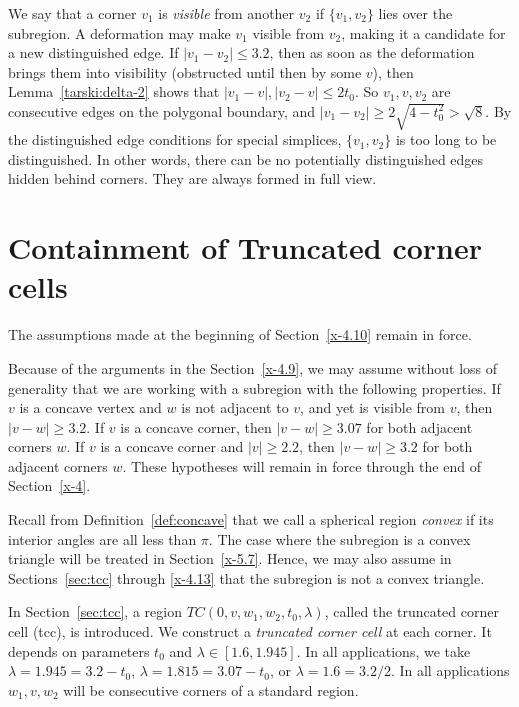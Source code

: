 We say that a corner $v_1$ is {\it visible} from another $v_2$ if
$\{v_1,v_2\}$ lies over the subregion.  A deformation may make $v_1$
visible from $v_2$, making it a candidate for a new distinguished edge.
If $|v_1-v_2|\le 3.2$, then as soon as the deformation brings them into
visibility (obstructed until then by some $v$), then
Lemma~\ref{tarski:delta-2} shows that $|v_1-v|,|v_2-v|\le2t_0$. So
$v_1,v,v_2$ are consecutive edges on the polygonal boundary, and
$|v_1-v_2|\ge 2\sqrt{4-t_0^2} > \sqrt{8}$. By the distinguished edge
conditions for special simplices, $\{v_1,v_2\}$ is too long to be
distinguished.  In other words, there can be no potentially
distinguished edges hidden behind corners. They are always formed in
full view.




\section{Containment of Truncated corner cells} %

The assumptions made at the beginning of Section~\ref{x-4.10} remain in
force.  

Because of the arguments in the Section~\ref{x-4.9}, we may assume
without loss of generality that we are working with a subregion
with the following properties. If $v$ is a concave vertex and $w$
is not adjacent to $v$, and yet is visible from $v$, then
$|v-w|\ge3.2$. If $v$ is a concave corner, then $|v-w|\ge3.07$ for
both adjacent corners $w$. If $v$ is a concave corner and
$|v|\ge2.2$, then $|v-w|\ge3.2$ for both adjacent corners $w$.
These hypotheses will remain in force through the end of
Section~\ref{x-4}.



Recall from Definition~\ref{def:concave} that we call a spherical
region {\it convex} if its interior angles are all less than
$\pi$. The case where the subregion is a convex triangle will be
treated in Section~\ref{x-5.7}. Hence, we may also assume in
Sections~\ref{sec:tcc} through \ref{x-4.13} that the subregion is
not a convex triangle.

In Section~\ref{sec:tcc}, a region $TC(0,v,w_1,w_2,t_0,\lambda)$,
called the
truncated corner cell (tcc), is introduced.
We construct a {\it truncated corner cell\/} at each corner.  It depends on 
parameters $t_0$ and $\lambda \in [1.6,1.945]$. In all applications, we
take
    $\lambda = 1.945 = 3.2-t_0$, $\lambda = 1.815 = 3.07-t_0$, or
    $\lambda = 1.6 = 3.2/2$.
In all applications $w_1,v,w_2$ will be consecutive corners of
a standard region.

